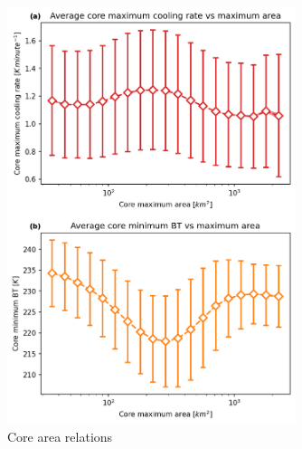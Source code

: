 \begin{figure}[tp]
    \centering
    \includegraphics[width=0.75\textwidth]{figures/ch2_11.png}
    \caption{Core area relations}
    \label{fig:core_area_relations}
\end{figure}



